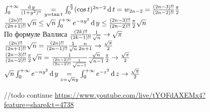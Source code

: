 \documentclass[12pt]{article}
\begin{document}
\begin{enumerate}
    $\int_0^{+\infty} \frac{\operatorname{d} y}{(1+y^2)^n} \underset{y=\tan t}= \int_0^{\frac\pi2} (\cos t)^{2n-2}\operatorname{d} t = w_{2n-2} = \frac{(2n-3)!!}{(2n-2)!!}\frac\pi2$\\
    $\frac{(2n)!!}{(2n+1)!!}\sqrt n \leq \sqrt n\int_0^{+\infty} e^{-ny^2}\operatorname{d} y \leq \frac{(2n-3)!!}{(2n-2)!!}\frac\pi2\sqrt n$\\
    По формуле Валлиса $\frac{(2k)!!}{(2k-1)!!}\frac1{\sqrt n} \rightarrow \sqrt \pi$\\
    $\frac{(2n)!!}{(2n+1)!!}\sqrt n = \frac{(2n)!!}{(2n-1)!!}\frac1{\sqrt n}\frac n{2n+1} \rightarrow \frac{\sqrt\pi}2$\\
    $\frac{(2n-3)!!}{(2n-2)!!}\frac\pi2\sqrt n = \frac1{\frac{(2n-2)!!}{(2n-3)!!}\frac1{\sqrt {n-1}}}\frac{\sqrt n}{\sqrt{n-1}}\frac\pi2 \rightarrow \frac{\sqrt\pi}2$\\
    $\sqrt n\int_0^{+\infty} e^{-ny^2}\operatorname{d} y \underset{z=\sqrt n y}= \int_0^{+\infty}e^{-z^2}\operatorname{d} z \rightarrow \frac{\sqrt\pi}2$
\end{enumerate}
//todo continue \url{https://www.youtube.com/live/tYOFdAXEMx4?feature=share&t=4738}
\end{document}
